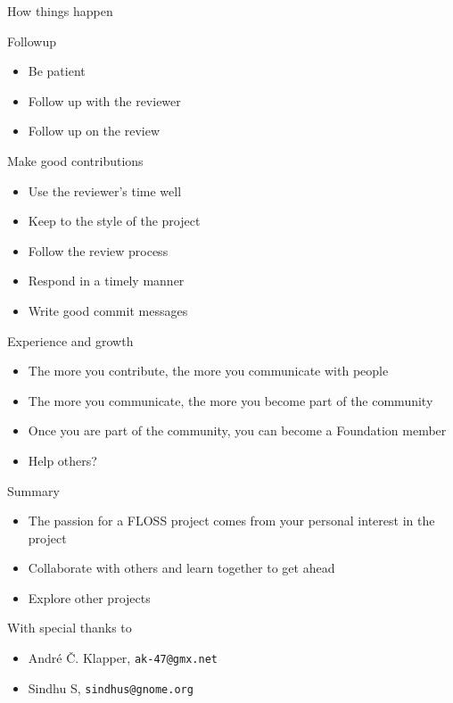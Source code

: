 \documentclass{beamer}
\begin{document}
\begin{frame}{How things happen}
\end{frame}

\begin{frame}{Followup}
  \begin{itemize}
  \item
    Be patient
  \item
    Follow up with the reviewer
  \item
    Follow up on the review
  \end{itemize}
\end{frame}

\begin{frame}{Make good contributions}
  \begin{itemize}
  \item
    Use the reviewer's time well
  \item
    Keep to the style of the project
  \item
    Follow the review process
  \item
    Respond in a timely manner
  \item
    Write good commit messages
  \end{itemize}
\end{frame}

\begin{frame}{Experience and growth}
  \begin{itemize}
  \item
    The more you contribute, the more you communicate with people
  \item
    The more you communicate, the more you become part of the community
  \item
    Once you are part of the community, you can become a Foundation member
  \end{itemize} 
  \begin{itemize}
  \item
    Help others?
  \end{itemize}
\end{frame}

\begin{frame}{Summary}
  \begin{itemize}
  \item
    The \alert{passion} for a FLOSS project comes from your personal interest in the project
  \item
    \alert{Collaborate} with others and \alert{learn together} to get ahead
  \item
    \alert{Explore} other projects
  \end{itemize}
  
  With special thanks to
  \begin{itemize}
  \item
    Andr\'{e} \v{C}. Klapper, \texttt{ak-47@gmx.net} 
  \item
    Sindhu S, \texttt{sindhus@gnome.org}
  \end{itemize}
\end{frame}
\end{document}
